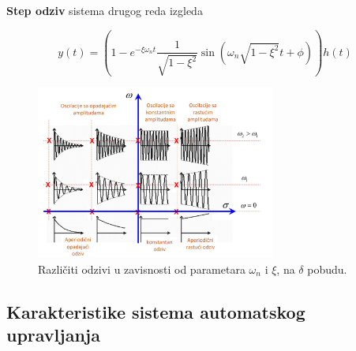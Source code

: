 \documentclass[12pt]{IEEEtran}
\numberwithin{equation}{subsection}
\numberwithin{figure}{section}
\begin{document}
\begin{enumerate}
          \textbf{Step odziv} sistema drugog reda izgleda

          \begin{equation}
              y(t) = \left(1 - e^{-\xi\omega_{n}t}\frac{1}{\sqrt{1 - \xi^2}}\sin{(\omega_{n}\sqrt{1-\xi^2}t + \phi)}\right)h(t)
          \end{equation}

          \begin{figure}[h]
              \centering
              \includegraphics[width=0.7\textwidth]{Pictures/Screenshot 2023-10-21 213251.png}
              \caption{Razli\v{c}iti odzivi u zavisnosti od parametara $\omega_{n}$ i $\xi$, na $\delta$ pobudu.}
          \end{figure}

\end{enumerate}

\newpage

\subsection{\textbf{Karakteristike sistema automatskog upravljanja}}
\end{document}
